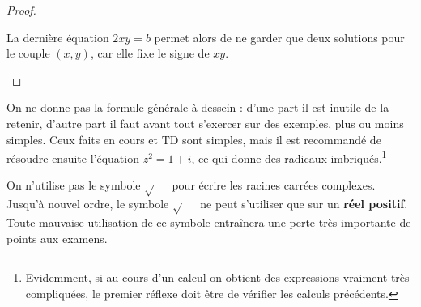 \begin{proof}
\begin{enumerate}
La dernière équation $2xy=b$ permet alors de ne garder que deux solutions pour le couple $(x,y)$, car elle fixe le signe de $xy$.
\end{enumerate}
\end{proof}

On ne donne pas la formule générale à dessein : d'une part il est inutile de la retenir, d'autre part il faut avant tout s'exercer sur des exemples, plus ou moins simples. Ceux faits en cours et TD sont simples, mais il est recommandé de résoudre ensuite l'équation $z^2=1+i$, ce qui donne des radicaux imbriqués.\footnote{Evidemment, si au cours d'un calcul on obtient des expressions vraiment très compliquées, le premier réflexe doit être de vérifier les calculs précédents.}


\begin{attention}
On n'utilise pas le symbole $\sqrt{\phantom{aa}}$ pour écrire les racines carrées complexes. Jusqu'à nouvel ordre, le symbole $\sqrt{\phantom{aa}}$ ne peut s'utiliser que sur un \textbf{réel positif}. Toute mauvaise utilisation de ce symbole entraînera une perte très importante de points aux examens.
\end{attention}